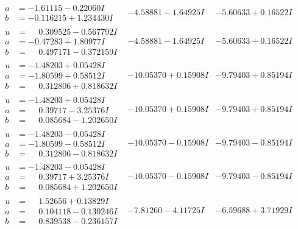 \documentclass[1p]{elsarticle_modified}
\theoremstyle{definition}
\begin{document}
$$\begin{array}{c|c|c}
\begin{aligned}
a &= -1.61115 - 0.22060 I \\
b &= -0.116215 + 1.234430 I\end{aligned}
 & -4.58881 - 1.64925 I & -5.60633 + 0.16522 I \\ \hline\begin{aligned}
u &= \phantom{-}0.309525 - 0.567792 I \\
a &= -0.47283 + 1.80977 I \\
b &= \phantom{-}0.497171 - 0.372159 I\end{aligned}
 & -4.58881 - 1.64925 I & -5.60633 + 0.16522 I \\ \hline\begin{aligned}
u &= -1.48203 + 0.05428 I \\
a &= -1.80599 + 0.58512 I \\
b &= \phantom{-}0.312806 + 0.818632 I\end{aligned}
 & -10.05370 + 0.15908 I & -9.79403 + 0.85194 I \\ \hline\begin{aligned}
u &= -1.48203 + 0.05428 I \\
a &= \phantom{-}0.39717 - 3.25376 I \\
b &= \phantom{-}0.085684 - 1.202650 I\end{aligned}
 & -10.05370 + 0.15908 I & -9.79403 + 0.85194 I \\ \hline\begin{aligned}
u &= -1.48203 - 0.05428 I \\
a &= -1.80599 - 0.58512 I \\
b &= \phantom{-}0.312806 - 0.818632 I\end{aligned}
 & -10.05370 - 0.15908 I & -9.79403 - 0.85194 I \\ \hline\begin{aligned}
u &= -1.48203 - 0.05428 I \\
a &= \phantom{-}0.39717 + 3.25376 I \\
b &= \phantom{-}0.085684 + 1.202650 I\end{aligned}
 & -10.05370 - 0.15908 I & -9.79403 - 0.85194 I \\ \hline\begin{aligned}
u &= \phantom{-}1.52656 + 0.13829 I \\
a &= \phantom{-}0.104118 - 0.130246 I \\
b &= \phantom{-}0.839538 - 0.236157 I\end{aligned}
 & -7.81260 - 4.11725 I & -6.59688 + 3.71929 I \\ \hline\begin{aligned}

\end{aligned}
\end{array}$$
\end{document}

